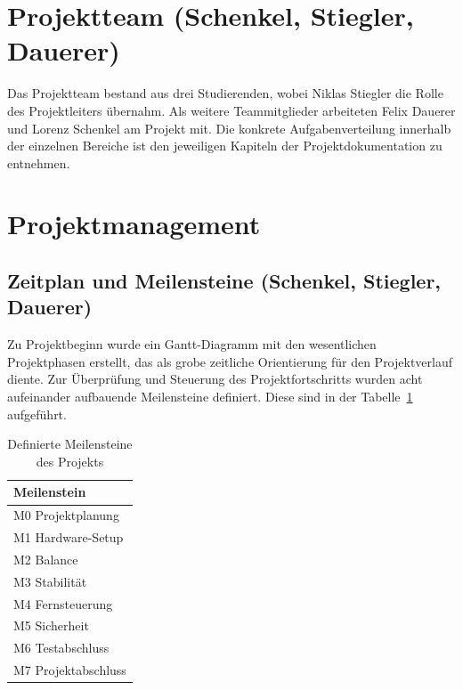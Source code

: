 \documentclass[fontsize=12pt,
parskip=half,	%
department=FakM,  %
logostyle=flat,
twoside, %
DIV=15,BCOR=10mm, %
]{OTHRreprt}
\begin{document}
\section{Projektteam (Schenkel, Stiegler, Dauerer)}
\label{sec:projektteam}

Das Projektteam bestand aus drei Studierenden, wobei Niklas Stiegler die Rolle des Projektleiters übernahm. Als weitere Teammitglieder arbeiteten Felix Dauerer und Lorenz Schenkel am Projekt mit. Die konkrete Aufgabenverteilung innerhalb der einzelnen Bereiche ist den jeweiligen Kapiteln der Projektdokumentation zu entnehmen.

\section{Projektmanagement}
\label{sec:projektmanagement}

\subsection{Zeitplan und Meilensteine (Schenkel, Stiegler, Dauerer)}
\label{subsec:zeitplan_meilensteine}

Zu Projektbeginn wurde ein Gantt-Diagramm mit den wesentlichen Projektphasen erstellt, das als grobe zeitliche Orientierung für den Projektverlauf diente. Zur Überprüfung und Steuerung des Projektfortschritts wurden acht aufeinander aufbauende Meilensteine definiert. Diese sind in der Tabelle~\ref{tab:meilensteine} aufgeführt.

\begin{table}[h]
    \centering
    \caption{Definierte Meilensteine des Projekts}
    \label{tab:meilensteine}
    \begin{tabular}{|l|}
        \hline
        \textbf{Meilenstein} \\
        \hline
        M0 Projektplanung \\
        \hline
        M1 Hardware-Setup  \\
        \hline
        M2 Balance  \\
        \hline
        M3 Stabilität  \\
        \hline
        M4 Fernsteuerung  \\
        \hline
        M5 Sicherheit \\
        \hline
        M6 Testabschluss \\
        \hline
        M7 Projektabschluss \\
        \hline
    \end{tabular}
\end{table}
\end{document}
